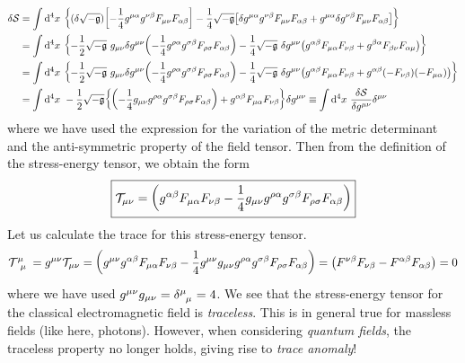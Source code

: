 \begin{align*}
    \delta \mathcal S &= \int \dd^4 x\ \qty{(\delta \sqrt{-\mathfrak{g}}) \qty[-\frac{1}{4}g^{\mu\alpha}g^{\nu \beta}F_{\mu\nu}F_{\alpha\beta}] -\frac{1}{4}\sqrt{-\mathfrak{g}}\qty[\delta g^{\mu\alpha} g^{\nu\beta}F_{\mu\nu}F_{\alpha\beta} +g^{\mu\alpha} \delta g^{\nu\beta}F_{\mu\nu}F_{\alpha\beta}] }\\
    &=\int \dd^4x\ \qty{-\frac{1}{2}\sqrt{-\mathfrak{g}}\ g_{\mu\nu}\delta g^{\mu\nu} \qty(-\frac{1}{4} g^{\rho\alpha}g^{\sigma\beta} F_{\rho\sigma}F_{\alpha\beta}) -\frac{1}{4}\sqrt{-\mathfrak{g}}\ \delta g^{\mu\nu}\qty(g^{\alpha\beta}F_{\mu\alpha}F_{\nu\beta} + g^{\beta \alpha}F_{\beta\nu}F_{\alpha\mu})}\\
    &=\int \dd^4x\ \qty{-\frac{1}{2}\sqrt{-\mathfrak{g}}\ g_{\mu\nu}\delta g^{\mu\nu} \qty(-\frac{1}{4} g^{\rho\alpha}g^{\sigma\beta} F_{\rho\sigma}F_{\alpha\beta}) -\frac{1}{4}\sqrt{-\mathfrak{g}}\ \delta g^{\mu\nu}\qty(g^{\alpha\beta}F_{\mu\alpha}F_{\nu\beta} + g^{ \alpha\beta}(-F_{\nu\beta})(-F_{\mu\alpha}))}\\
    &=\int \dd^4x\ -\frac{1}{2}\sqrt{-\mathfrak{g}}\qty{ \qty(  -\frac{1}{4}g_{\mu\nu} g^{\rho\alpha}g^{\sigma\beta} F_{\rho\sigma}F_{\alpha\beta}) +g^{\alpha\beta}F_{\mu\alpha}F_{\nu\beta}}\delta g^{\mu\nu}\equiv \int \dd^4x \ \frac{\delta \mathcal S}{\delta g^{\mu\nu}}\delta^{\mu\nu}
\end{align*}
where we have used the expression for the variation of the metric determinant and the anti-symmetric property of the field tensor. Then from the definition of the stress-energy tensor, we obtain the form 
$$\boxed{\mathcal T_{\mu\nu} = \qty( g^{\alpha\beta}F_{\mu\alpha}F_{\nu\beta}-\frac{1}{4}g_{\mu\nu} g^{\rho\alpha}g^{\sigma\beta} F_{\rho\sigma}F_{\alpha\beta}) }$$
Let us calculate the trace for this stress-energy tensor. 
\begin{align*}
    \tensor{\ST}{^\mu _\mu} = g^{\mu\nu}\ST_{\mu\nu} =  \qty( g^{\mu\nu}g^{\alpha\beta}F_{\mu\alpha}F_{\nu\beta}-\frac{1}{4}g^{\mu\nu}g_{\mu\nu} g^{\rho\alpha}g^{\sigma\beta} F_{\rho\sigma}F_{\alpha\beta})= \qty( F^{\nu\beta}F_{\nu\beta}-F^{\alpha\beta}F_{\alpha\beta}) =0
\end{align*}
where we have used $g^{\mu\nu}g_{\mu\nu} = \tensor{\delta}{^\mu _\mu}=4$. We see that the stress-energy tensor for the classical electromagnetic field is \textit{traceless}. This is in general true for massless fields (like here, photons). However, when considering \textit{quantum fields}, the traceless property no longer holds, giving rise to \textit{trace anomaly}!
